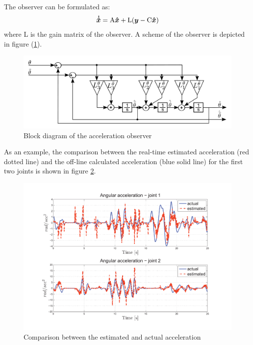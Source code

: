 \documentclass[journal]{IEEEtran}
\newcommand{\vectm}[1]{ { {\text #1} }}
\newcommand{\vects}[1]{{\boldsymbol {#1}}}
\begin{document}
The observer can be formulated as:
%
\begin{equation}
\vects{\dot{\hat{x}}}=\vectm{A}\vects{\hat{x}}+\vectm{L}(\vects{y}-\vectm{C}\vects{\hat{x}})
\end{equation}
%
where L is the gain matrix of the observer. A scheme of the observer is depicted in figure (\ref{fig:block_acc_observer}). 
%
\begin{figure}[htb]
	\centering
	\includegraphics[width=1.0\columnwidth]{aKalmanFilter}
	\caption{Block diagram of the acceleration observer}
	\label{fig:block_acc_observer}
\end{figure}

As an example, the comparison between the real-time estimated acceleration (red dotted line) and the off-line calculated acceleration (blue solid line) for the first two joints is shown in figure \ref{fig:acceleration_validation}.
%
\begin{figure}[htb]
	\centering
	\includegraphics[width=1.0\columnwidth]{a1_a2_vs_ak1_ak2.pdf}
	\caption{Comparison between the estimated and actual acceleration}
	\label{fig:acceleration_validation}
\end{figure}
\end{document}
